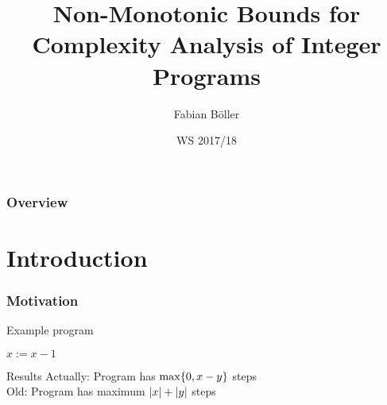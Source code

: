\documentclass{beamer}
\title[Non-Monotonic Bounds for Complexity Analysis of Integer Programs]{Non-Monotonic Bounds for Complexity Analysis of Integer Programs}
\author{Fabian B\"{o}ller} %
\institute[i2] %
{
RWTH Aachen \\ %
\medskip
\textit{fabian.boeller@rwth-aachen.de} %
}
\date{WS 2017/18} %
\begin{document}
\begin{frame}
\titlepage %
\end{frame}

\begin{frame}
\frametitle{Overview} %
\tableofcontents %
\end{frame}


\section{Introduction}

\begin{frame}
  \frametitle{Motivation}
  \begin{block}{Example program}
    \begin{algorithmic}
        \State $x := x - 1$
      \EndWhile
    \end{algorithmic}
  \end{block}
  \begin{block}{Results}
    Actually: Program has $\max \lbrace 0,x-y \rbrace$ steps \\
    Old: Program has maximum $\left|x\right|+\left|y\right|$ steps
  \end{block}
\end{frame}
\end{document}
